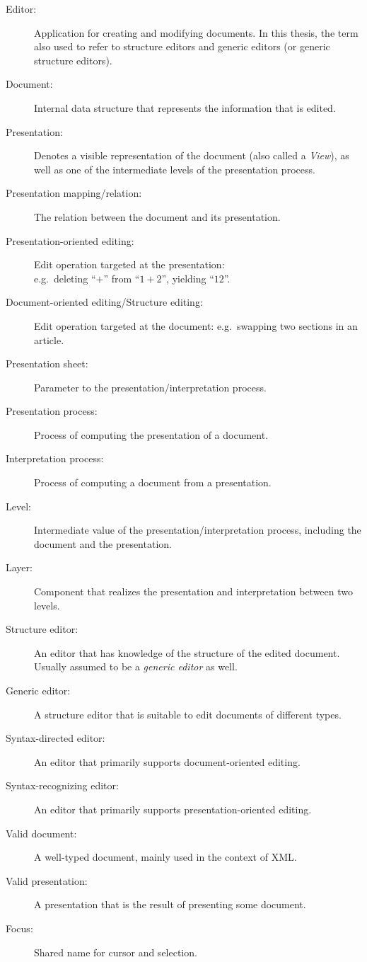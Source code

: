 \begin{description}
\item[Editor:] Application for creating and modifying documents. In this thesis, the term also used to refer to structure editors and generic editors (or generic structure editors).
\item[Document:] Internal data structure that represents the information that is edited.
\item[Presentation:] Denotes a visible representation of the document (also called a {\em View}), as well as one of the intermediate levels of the presentation process. 
\item[Presentation mapping/relation:] The relation between the document and its presentation.
\item[Presentation-oriented editing:] Edit operation targeted at the presentation:\\ e.g.\ deleting ``\;$+$\;'' from ``$1+2$'', yielding ``$12$''.
\item[Document-oriented editing/Structure editing:] Edit operation targeted at the document: e.g.\ swapping two sections in an article.
\item[Presentation sheet:] Parameter to the presentation/interpretation process. 
\item[Presentation process:] Process of computing the presentation of a document.
\item[Interpretation process:] Process of computing a document from a presentation.
\item[Level:] Intermediate value of the presentation/interpretation process, including the document and the presentation.
\item[Layer:] Component that realizes the presentation and interpretation between two levels.
\item[Structure editor:] An editor that has knowledge of the structure of the edited document. Usually assumed to be a {\em generic editor} as well.
\item[Generic editor:] A structure editor that is suitable to edit documents of different types.
\item[Syntax-directed editor:] An editor that primarily supports document-oriented editing.
\item[Syntax-recognizing editor:] An editor that primarily supports presentation-oriented editing.
\item[Valid document:] A well-typed document, mainly used in the context of XML.
\item[Valid presentation:] A presentation that is the result of presenting some document.
\item[Focus:] Shared name for cursor and selection.
\end{description} 

